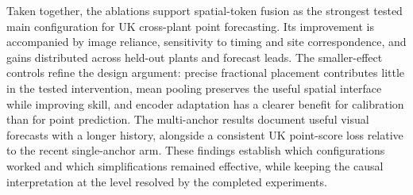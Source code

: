 Taken together, the ablations support spatial-token fusion as the strongest tested main configuration for UK cross-plant point forecasting. Its improvement is accompanied by image reliance, sensitivity to timing and site correspondence, and gains distributed across held-out plants and forecast leads. The smaller-effect controls refine the design argument: precise fractional placement contributes little in the tested intervention, mean pooling preserves the useful spatial interface while improving skill, and encoder adaptation has a clearer benefit for calibration than for point prediction. The multi-anchor results document useful visual forecasts with a longer history, alongside a consistent UK point-score loss relative to the recent single-anchor arm. These findings establish which configurations worked and which simplifications remained effective, while keeping the causal interpretation at the level resolved by the completed experiments.
